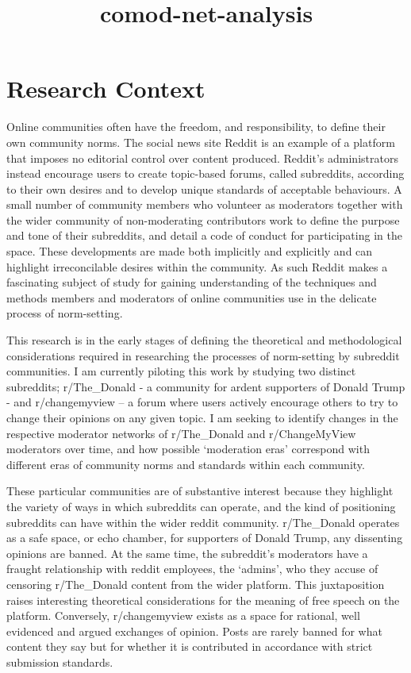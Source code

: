 \documentclass[11pt]{article}
\title{comod-net-analysis}
\begin{document}
    
    
    \maketitle
    
    

    
    \section{Research Context}\label{research-context}

Online communities often have the freedom, and responsibility, to define
their own community norms. The social news site Reddit is an example of
a platform that imposes no editorial control over content produced.
Reddit's administrators instead encourage users to create topic-based
forums, called subreddits, according to their own desires and to develop
unique standards of acceptable behaviours. A small number of community
members who volunteer as moderators together with the wider community of
non-moderating contributors work to define the purpose and tone of their
subreddits, and detail a code of conduct for participating in the space.
These developments are made both implicitly and explicitly and can
highlight irreconcilable desires within the community. As such Reddit
makes a fascinating subject of study for gaining understanding of the
techniques and methods members and moderators of online communities use
in the delicate process of norm-setting.

This research is in the early stages of defining the theoretical and
methodological considerations required in researching the processes of
norm-setting by subreddit communities. I am currently piloting this work
by studying two distinct subreddits; r/The\_Donald - a community for
ardent supporters of Donald Trump - and r/changemyview -- a forum where
users actively encourage others to try to change their opinions on any
given topic. I am seeking to identify changes in the respective
moderator networks of r/The\_Donald and r/ChangeMyView moderators over
time, and how possible `moderation eras' correspond with different eras
of community norms and standards within each community.

These particular communities are of substantive interest because they
highlight the variety of ways in which subreddits can operate, and the
kind of positioning subreddits can have within the wider reddit
community. r/The\_Donald operates as a safe space, or echo chamber, for
supporters of Donald Trump, any dissenting opinions are banned. At the
same time, the subreddit's moderators have a fraught relationship with
reddit employees, the `admins', who they accuse of censoring
r/The\_Donald content from the wider platform. This juxtaposition raises
interesting theoretical considerations for the meaning of free speech on
the platform. Conversely, r/changemyview exists as a space for rational,
well evidenced and argued exchanges of opinion. Posts are rarely banned
for what content they say but for whether it is contributed in
accordance with strict submission standards.
\end{document}
